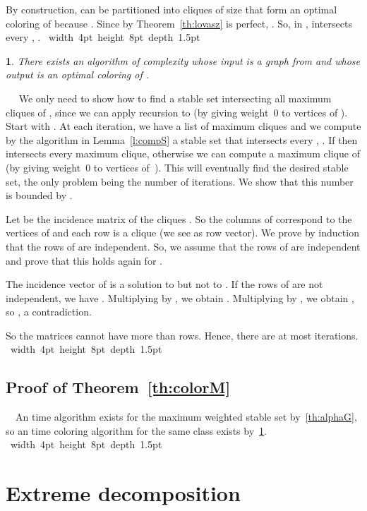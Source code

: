 \documentclass[11 pt] {article}
\newcommand\blackslug{\hbox{\hskip 1pt \vrule width 4pt height 8pt depth 1.5pt
        \hskip 1pt}}
\newcommand\bbox{\hfill \quad \blackslug \medbreak}
\newtheorem{theorem}{}[section]
\newcounter{claim}
\newcommand{\Proof}{\setcounter{claim}{0}\noindent{\bf Proof.}\ \ }
\begin{document}
  By construction,  can be partitioned into  cliques of size
   that form an optimal coloring of 
  because .  Since by Theorem~\ref{th:lovasz}
   is perfect, .  So, in ,  intersects
  every , .
\bbox


\begin{theorem}
  \label{th:color}
  There exists an algorithm of complexity  whose input is
  a graph from  and whose output is an optimal coloring of .
\end{theorem}

\Proof
  We only need to show how to find a stable set  intersecting all
  maximum cliques of , since we can apply recursion to  (by giving weight~0 to vertices of ).  Start with . At
  each iteration, we have a list of  maximum cliques  and we compute by the algorithm in Lemma~\ref{l:compS} a stable
  set  that intersects every , .  If
   then  intersects every
  maximum clique, otherwise we can compute a maximum clique 
  of  (by giving weight~0 to vertices of~).  This
  will eventually find the desired stable set, the only problem being the
  number of iterations.  We show that this number is bounded by .

  Let  be the incidence matrix of the cliques .
  So the columns of  correspond to the vertices of  and each
  row is a clique (we see  as row vector).  We prove by induction
  that the rows of  are independent.  So, we assume that the rows
  of  are independent and prove that this holds again for .

  The incidence vector  of  is a solution to 
  but not to .  If the rows of 
  are not independent, we have .  Multiplying by , we obtain .  Multiplying by , we
  obtain , so , a
  contradiction.

  So the matrices  cannot have more than 
  rows. Hence, there are at most  iterations.
\bbox

\subsection*{Proof of Theorem~\ref{th:colorM}}

\Proof An  time algorithm exists for the maximum weighted
stable set  by~\ref{th:alphaG}, so an  time coloring
algorithm for the same class exists by~\ref{th:color}.  \bbox

\section{Extreme decomposition}
\label{sec:ext}
\end{document}

